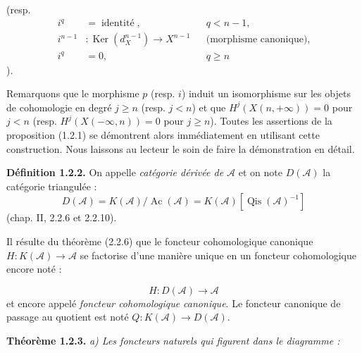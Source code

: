 \clearpage
{}%
\begingroup\small\setlength{\parskip}{0pt}\setlength{\emergencystretch}{1.5em}
\setlength{\abovedisplayskip}{4pt plus 2pt minus 2pt}%
\setlength{\belowdisplayskip}{4pt plus 2pt minus 2pt}%

\noindent(resp.
\[
\begin{aligned}
i^q&=\operatorname{identité},&&q<n-1,\\
i^{n-1}&\colon\operatorname{Ker}(d_X^{n-1})\longrightarrow X^{n-1}
  &&\text{(morphisme canonique)},\\
i^q&=0,&&q\geq n
\end{aligned}
\]
).

Remarquons que le morphisme $p$ (resp. $i$) induit un isomorphisme sur les
objets de cohomologie en degré $j\geq n$ (resp. $j<n$) et que
$H^j(X(n,+\infty))=0$ pour $j<n$ (resp. $H^j(X(-\infty,n))=0$ pour
$j\geq n$). Toutes les assertions de la proposition (1.2.1) se démontrent
alors immédiatement en utilisant cette construction. Nous laissons au
lecteur le soin de faire la démonstration en détail.

\medskip\noindent\textbf{Définition 1.2.2.}\quad
On appelle \emph{catégorie dérivée de $\mathcal A$} et on note
$D(\mathcal A)$ la catégorie triangulée :
\[
D(\mathcal A)=K(\mathcal A)/\operatorname{Ac}(\mathcal A)
=K(\mathcal A)[\operatorname{Qis}(\mathcal A)^{-1}]
\]
(chap. II, 2.2.6 et 2.2.10).

Il résulte du théorème (2.2.6) que le foncteur cohomologique canonique
$H\colon K(\mathcal A)\longrightarrow\mathcal A$ se factorise d'une manière
unique en un foncteur cohomologique encore noté :

\begin{equation}
H\colon D(\mathcal A)\longrightarrow\mathcal A
\tag{1.2.2.1}
\end{equation}
et encore appelé \emph{foncteur cohomologique canonique}. Le foncteur
canonique de passage au quotient est noté
$Q\colon K(\mathcal A)\longrightarrow D(\mathcal A)$.

\medskip\noindent\textbf{Théorème 1.2.3.}\quad
\textit{a) Les foncteurs naturels qui figurent dans le diagramme :}

\begin{center}
\end{center}
\endgroup
